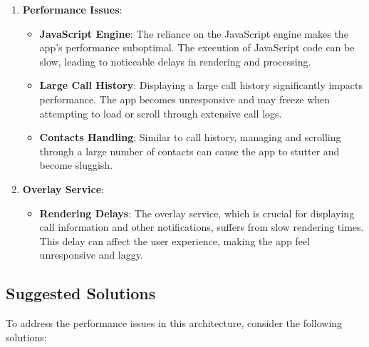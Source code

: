 \begin{enumerate}[label=\roman*.]
    \item \textbf{Performance Issues}:
    \begin{itemize}
        \item \textbf{JavaScript Engine}: The reliance on the JavaScript engine makes the app's performance suboptimal.
        The execution of JavaScript code can be slow, leading to noticeable delays in rendering and processing.
        \item \textbf{Large Call History}: Displaying a large call history significantly impacts performance.
        The app becomes unresponsive and may freeze when attempting to load or scroll through extensive call logs.
        \item \textbf{Contacts Handling}: Similar to call history, managing and scrolling through a large number of contacts can cause the app to stutter and become sluggish.
    \end{itemize}
    \item \textbf{Overlay Service}:
    \begin{itemize}
        \item \textbf{Rendering Delays}: The overlay service, which is crucial for displaying call information and other notifications, suffers from slow rendering times.
        This delay can affect the user experience, making the app feel unresponsive and laggy.
    \end{itemize}
\end{enumerate}

\subsection{Suggested Solutions}\label{subsec:suggested-solutions}

To address the performance issues in this architecture, consider the following solutions:


